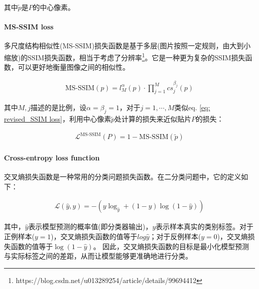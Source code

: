 \documentclass[letterpaper,12pt]{article}
\begin{document}
			其中$\tilde{p}$是$P$的中心像素。
			
			\paragraph{MS-SSIM loss}

			多尺度结构相似性(MS-SSIM)损失函数是基于多层(图片按照一定规则，由大到小缩放)的SSIM损失函数，相当于考虑了分辨率\footnote{https://blog.csdn.net/u013289254/article/details/99694412}。它是一种更为复杂的SSIM损失函数，可以更好地衡量图像之间的相似性。

			\begin{equation}
				\begin{aligned}
					\text{MS-SSIM}(p)=l_{M}^\alpha(p)\cdot \prod_{j=1}^M cs_{j}^{\beta_j}(p)
				\end{aligned}
				\label{eq: MS-SSIM}
			\end{equation}

			其中$M,j$描述的是比例，设$\alpha=\beta_j=1$，对于$j={1,\cdots, M}$类似eq. \ref{eq: revised_SSIM loss}，利用中心像素$\tilde{p}$处计算的损失来近似贴片$P$的损失：

			\begin{equation}
				\begin{aligned}
					\mathcal{L}^{\text{MS-SSIM}}(P)=1-\text{MS-SSIM}(\tilde{p})
				\end{aligned}
				\label{eq: MS-SSIM loss}
			\end{equation}
			
			\paragraph{Cross-entropy loss function}
			
			交叉熵损失函数是一种常用的分类问题损失函数。在二分类问题中，它的定义如下：
			
			\begin{equation}
				\begin{aligned}
					\mathcal{L}(\hat{y},y)=-\left( y\log_{\hat{y}} + (1-y) \log (1-\hat{y}) \right)
				\end{aligned}
				\label{eq: Cross-entropy loss}
			\end{equation}
			
			其中，$\hat{y}$表示模型预测的概率值(即分类器输出)，$y$表示样本真实的类别标签。对于正例样本($y=1$)，交叉熵损失函数的值等于$log {\hat{y}}$；对于反例样本($y=0$)，交叉熵损失函数的值等于$\log (1-\hat{y})$。 因此，交叉熵损失函数的目标是最小化模型预测与实际标签之间的差距，从而让模型能够更准确地进行分类。 
			
\end{document}
